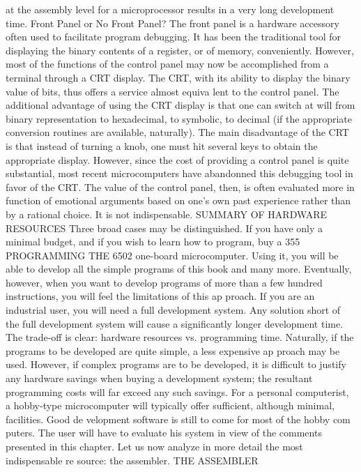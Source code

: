 {{{{{{{{{{{{{{{{{{{{{{{{{{{{{{{{{{{{{{{{{{{{{{{{{{{{{{{{{{{{{{{{{{{{{{{{{{{{{{{{{{{{{{{{{{{{{{{{{{{{{{{{{{{{{{{{{{{{{{{{{{{{{{{{{{{{{{{{{{{{at the assembly level for a microprocessor results in a very long
development time.
Front Panel or No Front Panel?
The front panel is a hardware accessory often used to facilitate
program debugging. It has been the traditional tool for displaying the
binary contents of a register, or of memory, conveniently. However,
most of the functions of the control panel may now be accomplished
from a terminal through a CRT display. The CRT, with its ability to
display the binary value of bits, thus offers a service almost equiva
lent to the control panel. The additional advantage of using the CRT
display is that one can switch at will from binary representation to
hexadecimal, to symbolic, to decimal (if the appropriate conversion
routines are available, naturally). The main disadvantage of the CRT
is that instead of turning a knob, one must hit several keys to obtain
the appropriate display. However, since the cost of providing a
control panel is quite substantial, most recent microcomputers have
abandonned this debugging tool in favor of the CRT. The value of
the control panel, then, is often evaluated more in function of
emotional arguments based on one's own past experience rather than
by a rational choice. It is not indispensable.
SUMMARY OF HARDWARE RESOURCES
Three broad cases may be distinguished. If you have only a
minimal budget, and if you wish to learn how to program, buy a
355
PROGRAMMING THE 6502
one-board microcomputer. Using it, you will be able to develop all
the simple programs of this book and many more. Eventually,
however, when you want to develop programs of more than a few
hundred instructions, you will feel the limitations of this ap
proach.
If you are an industrial user, you will need a full development
system. Any solution short of the full development system will
cause a significantly longer development time. The trade-off is
clear: hardware resources vs. programming time. Naturally, if the
programs to be developed are quite simple, a less expensive ap
proach may be used. However, if complex programs are to be
developed, it is difficult to justify any hardware savings when
buying a development system; the resultant programming costs will
far exceed any such savings.
For a personal computerist, a hobby-type microcomputer will
typically offer sufficient, although minimal, facilities. Good de
velopment software is still to come for most of the hobby com
puters. The user will have to evaluate his system in view of the
comments presented in this chapter.
Let us now analyze in more detail the most indispensable re
source: the assembler.
THE ASSEMBLER
}}}}}}}}}}}}}}}}}}}}}}}}}}}}}}}}}}}}}}}}}}}}}}}}}}}}}}}}}}}}}}}}}}}}}}}}}}}}}}}}}}}}}}}}}}}}}}}}}}}}}}}}}}}}}}}}}}}}}}}}}}}}}}}}}}}}}}}}}}}}
